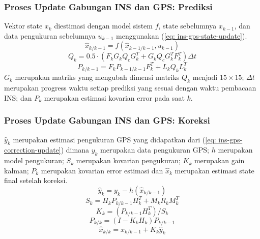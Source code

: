 \begin{frame}
    \frametitle{Proses Update Gabungan INS dan GPS: Prediksi}

    Vektor state $x_{k}$ diestimasi dengan model sistem $f$, state sebelumnya $x_{k-1}$, dan data pengukuran sebelumnya $u_{k-1}$ menggunakan (\ref{eq: ins-gps-state-update}).
    \begin{equation}
        \hat{x}_{k / k-1}=f\left(\hat{x}_{k-1 / k-1}, u_{k-1}\right)
        \label{eq: ins-gps-state-update}
    \end{equation}
    \begin{equation}
        Q_{k}=0.5 \cdot\left(F_{k} G_{k} Q_{c} G_{k}^{T}+G_{k} Q_{c} G_{k}^{T} F_{k}^{T}\right) \Delta t
    \end{equation}
    \begin{equation}
        P_{k / k-1}=F_{k} P_{k-1 / k-1} F_{k}^{T}+L_{k} Q_{k} L_{k}^{T}
    \end{equation}
    $G_k$ merupakan matriks yang mengubah dimensi matriks $Q_k$ menjadi $15 \times 15$; $\Delta t$ merupakan progress waktu setiap prediksi yang sesuai dengan waktu pembacaan INS; dan $P_k$ merupakan estimasi kovarian error pada saat $k$.  
\end{frame}


\begin{frame}
    \frametitle{Proses Update Gabungan INS dan GPS: Koreksi}

    $\hat{y}_k$ merupakan estimasi pengukuran GPS yang didapatkan dari (\ref{eq: ins-gps-correction-update}) dimana $y_k$ merupakan data pengukuran GPS; $h$ merupakan model pengukuran; $S_k$ merupakan kovarian pengukuran; $K_k$ merupakan gain kalman; $P_k$ merupakan kovarian error estimasi dan $\hat{x}_k$ merupakan estimasi state final setelah koreksi.
    \begin{equation}
        \hat{y}_{k}=y_{k}-h\left(\hat{x}_{k / k-1}\right)
        \label{eq: ins-gps-correction-update}
    \end{equation}
    \begin{equation}
        S_{k}=H_{k} P_{k / k-1} H_{k}^{T}+M_{k} R_{k} M_{k}^{T}
    \end{equation}
    \begin{equation}
        K_{k}=\left(P_{k / k-1} H_{k}^{T}\right) / S_{k}
    \end{equation}
    \begin{equation}
        P_{k / k}=\left(I-K_{k} H_{k}\right) P_{k / k-1}
    \end{equation}
    \begin{equation}
        \hat{x}_{k / k}=\hat{x}_{k / k-1}+K_{k} \hat{y}_{k}
    \end{equation}
\end{frame}


